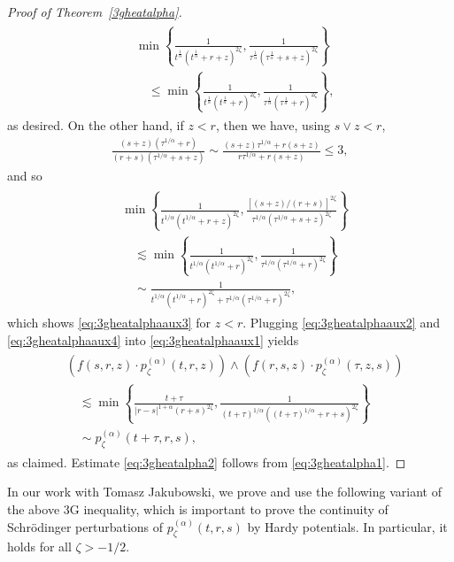 \documentclass[12pt,reqno,a4paper]{amsart}
\theoremstyle{definition}
\theoremstyle{remark}
\numberwithin{equation}{section}
\newcommand{\1}{\mathbbm{1}}
\begin{document}
\begin{proof}[Proof of Theorem~\ref{3gheatalpha}]
\begin{align}
\begin{split}
      & \min\left\{\frac{1}{t^{\frac1\alpha}(t^{\frac1\alpha}+r+z)^{2\zeta}},\frac{1}{\tau^{\frac1\alpha}(\tau^{\frac1\alpha}+s+z)^{2\zeta}}\right\} \\
      & \quad \leq \min\left\{\frac{1}{t^{\frac1\alpha}(t^{\frac1\alpha}+r)^{2\zeta}},\frac{1}{\tau^{\frac1\alpha}(\tau^{\frac1\alpha}+r)^{2\zeta}}\right\},
    \end{split}
  \end{align}
  as desired. On the other hand, if $z<r$, then we have, using $s\vee z<r$,
  \begin{align*}
    \frac{(s+z)(\tau^{1/\alpha}+r)}{(r+s)(\tau^{1/\alpha}+s+z)}
    \sim \frac{(s+z)\tau^{1/\alpha} + r(s+z)}{r\tau^{1/\alpha} + r(s+z)}
    \leq 3,
  \end{align*}
  and so
  \begin{align}
    \label{eq:3gheatalphaaux6}
    \begin{split}
      & \min\left\{\frac{1}{t^{1/\alpha}(t^{1/\alpha}+r+z)^{2\zeta}},\frac{[(s+z)/(r+s)]^{2\zeta}}{\tau^{1/\alpha}(\tau^{1/\alpha}+s+z)^{2\zeta}}\right\} \\
      & \quad \lesssim \min\left\{\frac{1}{t^{1/\alpha}(t^{1/\alpha}+r)^{2\zeta}},\frac{1}{\tau^{1/\alpha}(\tau^{1/\alpha}+r)^{2\zeta}}\right\} \\
      & \quad \sim \frac{1}{t^{1/\alpha}(t^{1/\alpha}+r)^{2\zeta} + \tau^{1/\alpha}(\tau^{1/\alpha}+r)^{2\zeta}},
    \end{split}
  \end{align}
  which shows \eqref{eq:3gheatalphaaux3} for $z<r$. Plugging \eqref{eq:3gheatalphaaux2} and \eqref{eq:3gheatalphaaux4} into \eqref{eq:3gheatalphaaux1} yields
  \begin{align}
    \begin{split}
      & \left(f(s,r,z)\cdot p_\zeta^{(\alpha)}(t,r,z)\right) \wedge \left(f(r,s,z) \cdot p_\zeta^{(\alpha)}(\tau,z,s)\right) \\
      & \quad \lesssim \min\left\{\frac{t+\tau}{|r-s|^{1+\alpha}(r+s)^{2\zeta}}, \frac{1}{(t+\tau)^{1/\alpha}((t+\tau)^{1/\alpha}+r+s)^{2\zeta}}\right\} \\
      & \quad \sim p_\zeta^{(\alpha)}(t+\tau,r,s),
    \end{split}
  \end{align}
  as claimed. Estimate \eqref{eq:3gheatalpha2} follows from \eqref{eq:3gheatalpha1}.
\end{proof}

In our work \cite{Bogdanetal2024} with Tomasz Jakubowski, we prove and use the following variant of the above 3G inequality, which is important to prove the continuity of Schr\"odinger perturbations of $p_\zeta^{(\alpha)}(t,r,s)$ by Hardy potentials. In particular, it holds for all $\zeta>-1/2$.
\end{document}
